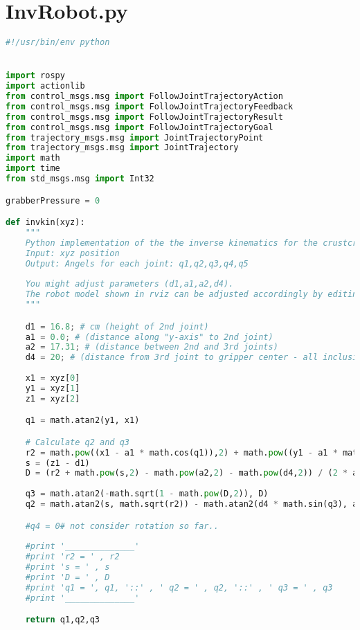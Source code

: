 \newpage
\section{InvRobot.py}\label{sec:InvRobot}
\begin{lstlisting}[language=Python]
#!/usr/bin/env python


import rospy
import actionlib
from control_msgs.msg import FollowJointTrajectoryAction
from control_msgs.msg import FollowJointTrajectoryFeedback
from control_msgs.msg import FollowJointTrajectoryResult
from control_msgs.msg import FollowJointTrajectoryGoal
from trajectory_msgs.msg import JointTrajectoryPoint
from trajectory_msgs.msg import JointTrajectory
import math
import time
from std_msgs.msg import Int32

grabberPressure = 0

def invkin(xyz):
    """
    Python implementation of the the inverse kinematics for the crustcrawler
    Input: xyz position
    Output: Angels for each joint: q1,q2,q3,q4,q5
    
    You might adjust parameters (d1,a1,a2,d4).
    The robot model shown in rviz can be adjusted accordingly by editing au_crustcrawler_ax12.urdf
    """

    d1 = 16.8; # cm (height of 2nd joint)
    a1 = 0.0; # (distance along "y-axis" to 2nd joint)
    a2 = 17.31; # (distance between 2nd and 3rd joints)
    d4 = 20; # (distance from 3rd joint to gripper center - all inclusive, ie. also 4th joint)
    
    x1 = xyz[0]
    y1 = xyz[1]
    z1 = xyz[2]

    q1 = math.atan2(y1, x1)

    # Calculate q2 and q3
    r2 = math.pow((x1 - a1 * math.cos(q1)),2) + math.pow((y1 - a1 * math.sin(q1)),2)
    s = (z1 - d1)
    D = (r2 + math.pow(s,2) - math.pow(a2,2) - math.pow(d4,2)) / (2 * a2 * d4)
    
    q3 = math.atan2(-math.sqrt(1 - math.pow(D,2)), D)
    q2 = math.atan2(s, math.sqrt(r2)) - math.atan2(d4 * math.sin(q3), a2 + d4 * math.cos(q3))-(math.pi/2)

    #q4 = 0# not consider rotation so far..
    
    #print '______________'
    #print 'r2 = ' , r2
    #print 's = ' , s
    #print 'D = ' , D
    #print 'q1 = ', q1, '::' , ' q2 = ' , q2, '::' , ' q3 = ' , q3
    #print '______________'

    return q1,q2,q3


\end{lstlisting}
